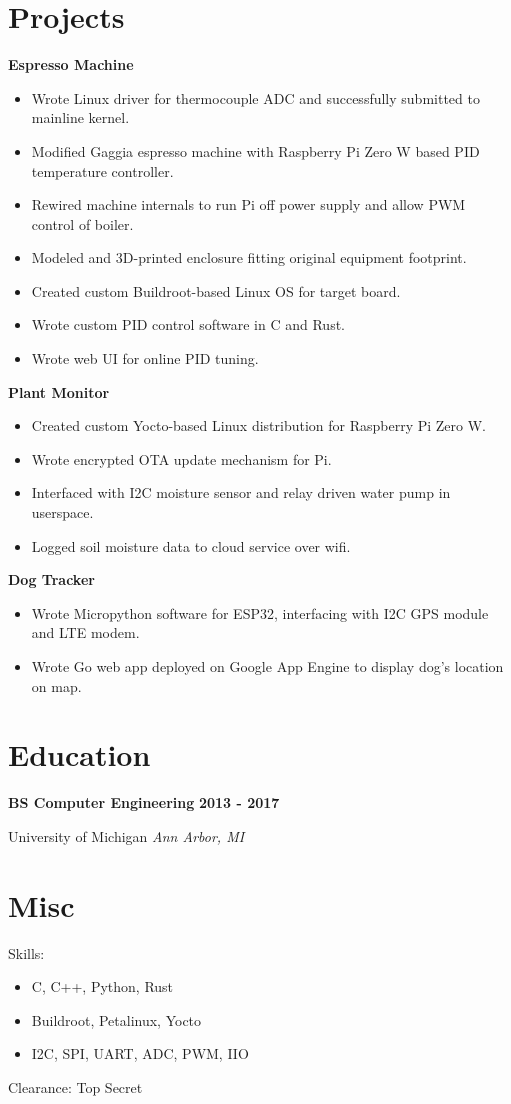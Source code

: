 \documentclass{article}
\newcommand{\experience}[4]{
    \noindent \textbf{#1} \hfill \textbf{#2} \par
    \noindent #3 \hfill \textit{#4} \par
}
\begin{document}
    \section*{Projects}
        \noindent \textbf{Espresso Machine}
        \begin{itemize}
            \item Wrote Linux driver for thermocouple ADC and successfully submitted to mainline kernel.
            \item Modified Gaggia espresso machine with Raspberry Pi Zero W based PID temperature controller.
            \item Rewired machine internals to run Pi off power supply and allow PWM control of boiler.
            \item Modeled and 3D-printed enclosure fitting original equipment footprint.
            \item Created custom Buildroot-based Linux OS for target board.
            \item Wrote custom PID control software in C and Rust.
            \item Wrote web UI for online PID tuning.
        \end{itemize}

        \noindent \textbf{Plant Monitor}
        \begin{itemize}
            \item Created custom Yocto-based Linux distribution for Raspberry Pi Zero W.
            \item Wrote encrypted OTA update mechanism for Pi.
            \item Interfaced with I2C moisture sensor and relay driven water pump in userspace.
            \item Logged soil moisture data to cloud service over wifi.
        \end{itemize}

        \noindent \textbf{Dog Tracker}
        \begin{itemize}
            \item Wrote Micropython software for ESP32, interfacing with I2C GPS module and LTE modem.
            \item Wrote Go web app deployed on Google App Engine to display dog's location on map.
        \end{itemize}

    \section*{Education}
        \experience{BS Computer Engineering}{2013 - 2017}{University of Michigan}{Ann Arbor, MI}

    \section*{Misc}
        \noindent Skills:
        \begin{itemize}
            \item C, C++, Python, Rust
            \item Buildroot, Petalinux, Yocto
            \item I2C, SPI, UART, ADC, PWM, IIO
        \end{itemize}
        \noindent Clearance: Top Secret \par
\end{document}
